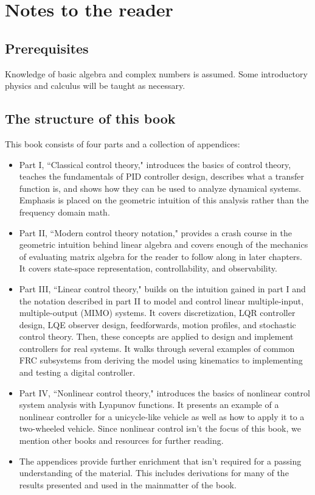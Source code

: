 
\setcounter{chapter}{-1}
\chapter{Notes to the reader}

\section{Prerequisites}

Knowledge of basic algebra and complex numbers is assumed. Some introductory
physics and calculus will be taught as necessary.

\section{The structure of this book}

This book consists of four parts and a collection of appendices:

\begin{itemize}
  \item Part I, ``Classical control theory," introduces the basics of control
    theory, teaches the fundamentals of PID controller design, describes what a
    transfer function is, and shows how they can be used to analyze dynamical
    systems. Emphasis is placed on the geometric intuition of this analysis
    rather than the frequency domain math.
  \item Part II, ``Modern control theory notation," provides a crash course in
    the geometric intuition behind linear algebra and covers enough of the
    mechanics of evaluating matrix algebra for the reader to follow along in
    later chapters. It covers state-space representation, controllability, and
    observability.
  \item Part III, ``Linear control theory," builds on the intuition gained in
    part I and the notation described in part II to model and control linear
    multiple-input, multiple-output (MIMO) systems. It covers discretization,
    LQR controller design, LQE observer design, feedforwards, motion profiles,
    and stochastic control theory. Then, these concepts are applied to design
    and implement controllers for real systems. It walks through several
    examples of common FRC subsystems from deriving the model using kinematics
    to implementing and testing a digital controller.
  \item Part IV, ``Nonlinear control theory," introduces the basics of nonlinear
    control system analysis with Lyapunov functions. It presents an example of a
    nonlinear controller for a unicycle-like vehicle as well as how to apply it
    to a two-wheeled vehicle. Since nonlinear control isn't the focus of this
    book, we mention other books and resources for further reading.
  \item The appendices provide further enrichment that isn't required for a
    passing understanding of the material. This includes derivations for many of
    the results presented and used in the mainmatter of the book.
\end{itemize}

